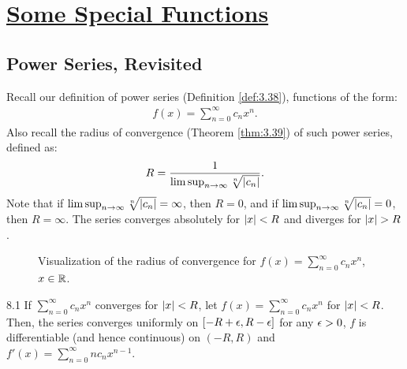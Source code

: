 \section[Some Special Functions]{\hyperlink{toc}{Some Special Functions}}

\subsection{Power Series, Revisited}
Recall our definition of power series (Definition \ref{def:3.38}), functions of the form:
\begin{align*}
    f(x) = \sum_{n=0}^\infty c_n x^n.
\end{align*}
Also recall the radius of convergence (Theorem \ref{thm:3.39}) of such power series, defined as:
\begin{align*}
    R = \frac{1}{\limsup_{n \rightarrow \infty}\sqrt[n]{\abs{c_n}}}.
\end{align*}
Note that if $\limsup_{n \rightarrow \infty}\sqrt[n]{\abs{c_n}} = \infty$, then $R = 0$, and if $\limsup_{n \rightarrow \infty}\sqrt[n]{\abs{c_n}} = 0$, then $R = \infty$. The series converges absolutely for $\abs{x} < R$ and diverges for $\abs{x} > R$.

\begin{figure}[htbp]
    \centering
    
    \caption{Visualization of the radius of convergence for $f(x) = \sum_{n=0}^\infty c_nx^n$, $x \in \mathbb{R}$.}
    \label{fig49}
\end{figure}

\begin{theorem}{}{8.1}
    If $\sum_{n=0}^\infty c_nx^n$ converges for $\abs{x} < R$, let $f(x) = \sum_{n=0}^\infty c_n x^n$ for $\abs{x} < R$. Then, the series converges uniformly on $[-R + \epsilon, R - \epsilon]$ for any $\epsilon > 0$, $f$ is differentiable (and hence continuous) on $(-R, R)$ and $f'(x) = \sum_{n=0}^\infty nc_nx^{n-1}$. 
\end{theorem}


